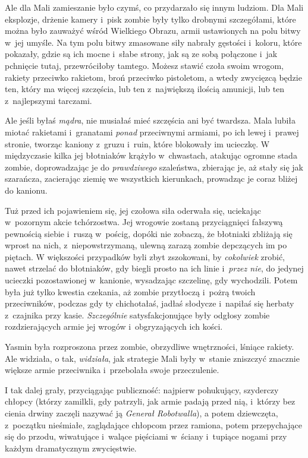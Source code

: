 \documentclass[oneside,polish,11pt,rmheadings]{mwbk}
\begin{document}
Ale dla Mali zamieszanie było czymś, co przydarzało się innym ludziom. Dla Mali eksplozje, drżenie kamery i~pisk zombie były tylko drobnymi szczegółami, które można było zauważyć wśród Wielkiego Obrazu, armii ustawionych na polu bitwy w~jej umyśle. Na tym polu bitwy zmasowane siły nabrały gęstości i~koloru, które pokazały, gdzie są ich mocne i~słabe strony, jak są ze sobą połączone i~jak pchnięcie tutaj, przewróciłoby tamtego. Możesz stawić czoła swoim wrogom, rakiety przeciwko rakietom, broń przeciwko pistoletom, a wtedy zwycięzcą będzie ten, który ma więcej szczęścia, lub ten z~największą ilością amunicji, lub ten z~najlepszymi tarczami. 


Ale jeśli byłaś \textit{mądra}, nie musiałaś mieć szczęścia ani być twardsza. Mala lubiła miotać rakietami i~granatami \textit{ponad }przeciwnymi armiami, po ich lewej i~prawej stronie, tworząc kaniony z~gruzu i~ruin, które blokowały im ucieczkę. W międzyczasie kilka jej błotniaków krążyło w~chwastach, atakując ogromne stada zombie, doprowadzając je do \textit{prawdziwego} szaleństwa, zbierając je, aż stały się jak szarańcza, zacierając ziemię we wszystkich kierunkach, prowadząc je coraz bliżej do kanionu. 


Tuż przed ich pojawieniem się, jej czołowa siła oderwała się, uciekając w~pozornym akcie tchórzostwa. Jej wrogowie zostaną przyciągnięci fałszywą pewnością siebie i~ruszą w~pościg, dopóki nie zobaczą, że błotniaki zbliżają się wprost na nich, z~niepowstrzymaną, ulewną zarazą zombie depczących im po piętach. W większości przypadków byli zbyt zszokowani, by \textit{cokolwiek }zrobić, nawet strzelać do błotniaków, gdy biegli prosto na ich linie i~\textit{przez nie}, do jedynej ucieczki pozostawionej w~kanionie, wysadzając szczelinę, gdy wychodzili. Potem była już tylko kwestia czekania, aż zombie przytłoczą i~pożrą twoich przeciwników, podczas gdy ty chichotałaś, jadłaś słodycze i~napiłaś się herbaty z~czajnika przy kasie. \textit{Szczególnie }satysfakcjonujące były odgłosy zombie rozdzierających armie jej wrogów i~obgryzających ich kości. 


Yasmin była rozproszona przez zombie, obrzydliwe wnętrzności, lśniące rakiety. Ale widziała, o tak, \textit{widziała}, jak strategie Mali były w~stanie zniszczyć znacznie większe armie przeciwnika i~przebolała swoje przeczulenie. 


I tak dalej grały, przyciągając publiczność: najpierw pohukujący, szyderczy chłopcy (którzy zamilkli, gdy patrzyli, jak armie padają przed nią, i~którzy bez cienia drwiny zaczęli nazywać ją \textit{Generał Robotwalla}), a potem dziewczęta, z~początku nieśmiałe, zaglądające chłopcom przez ramiona, potem przepychające się do przodu, wiwatujące i~walące pięściami w~ściany i~tupiące nogami przy każdym dramatycznym zwycięstwie. 
\end{document}
